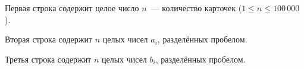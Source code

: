 Первая строка содержит целое число $n$~--- количество карточек ($1 \leq n \leq 100\,000$).

Вторая строка содержит $n$ целых чисел $a_i$, разделённых пробелом.

Третья строка содержит $n$ целых чисел $b_i$, разделённых пробелом.